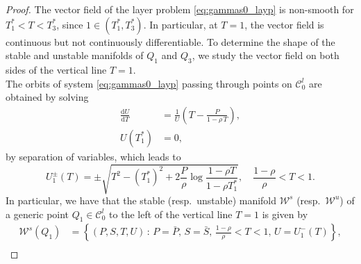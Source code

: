 \documentclass[10pt,a4paper]{amsart}
\begin{document}
\begin{proof}
The vector field of the layer problem \eqref{eq:gammas0_layp} is non-smooth for $T_1^\ast < T < T_3^\ast$, since $1 \in (T_1^\ast, T_3^\ast)$. In particular, at $T=1$, the vector field is continuous but not continuously differentiable. To determine the shape of the stable and unstable manifolds of $Q_1$ and $Q_3$, we study the vector field on both sides of the vertical line $T=1$.\\
The orbits of system \eqref{eq:gammas0_layp} passing through points on $\mathcal{C}_0^l$ are obtained by solving
\begin{equation}
\begin{aligned}
    \frac{\text{d}U}{\text{d}T} &= \frac{1}{U} \left(T - \frac{P}{1 - \rho\,T} \right), \\
    U(T_1^\ast) &= 0,
\end{aligned}
\end{equation}
by separation of variables, which leads to
\begin{equation}
    U_1^\pm (T) = 
    \pm \sqrt{T^2 - (T_1^\ast)^2 + 2 \frac{P}{\rho} \log \frac{1-\rho T}{1-\rho T_1^\ast}},\quad \frac{1-\rho}{\rho} < T < 1.
\end{equation}
In particular, we have that the stable (resp.~unstable) manifold $\mathcal{W}^{s}$ (resp.~$\mathcal{W}^{u}$) of a generic point $Q_1 \in \mathcal{C}_0^l$ to the left of the vertical line $T=1$ is given by
\begin{equation}
\begin{aligned}
    \mathcal{W}^{s} (Q_1) &= \left\{ (P, S, T, U) \, : \, P=\bar{P}, \, S=\bar{S},\, \frac{1-\rho}{\rho}<T<1, \,  U=U_1^-(T)  \right\}, \\

\end{aligned}
\end{equation}
\end{proof}
\end{document}
